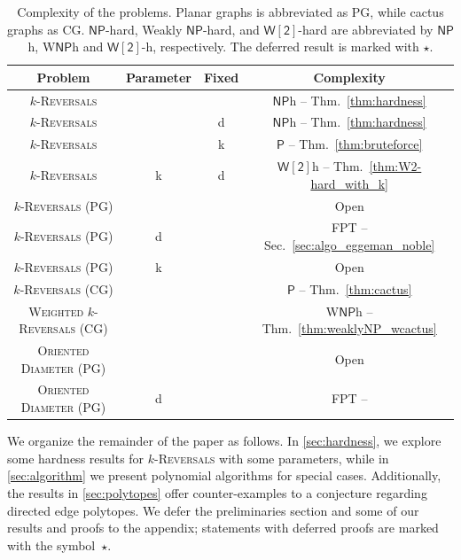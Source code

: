 \documentclass[11pt, twoside]{article}
\numberwithin{equation}{section}
\numberwithin{table}{section}
\numberwithin{figure}{section}
\theoremstyle{definition}
\theoremstyle{definition}
\theoremstyle{definition}
\def\NP{\mathsf{NP}}
\def\P{\mathsf{P}}
\def\W2{\mathsf{W[2]}}
\begin{document}
\begin{table}[h] \small
    \centering
    \caption{\small Complexity of the problems. Planar graphs is abbreviated as PG, while cactus graphs as CG. $\NP$-hard, Weakly $\NP$-hard, and $\W2$-hard are abbreviated by $\NP$h, W$\NP$h and $\W2$-h, respectively. The deferred result is marked with $\star$.}
    \label{table:complexity}
    \renewcommand*{\arraystretch}{0.85}
    \begin{tabular}{|c|c|c|c|} 
    \hline
    \textbf{Problem} & \textbf{Parameter} & \textbf{Fixed} & \textbf{Complexity} \\ \hline
         \textsc{$k$-Reversals}&  &  & $\NP$h -- Thm.~\ref{thm:hardness}\\
         \hline
         \textsc{$k$-Reversals}&  &  d& $\NP$h -- Thm.~\ref{thm:hardness}\\
         \hline
         \textsc{$k$-Reversals} &  &  k& $\P$ -- Thm.~\ref{thm:bruteforce} \\
         \hline
         \textsc{$k$-Reversals}&  k&  d& $\W2$h -- Thm.~\ref{thm:W2-hard_with_k}\\
         \hline
         \textsc{$k$-Reversals} (PG)&  &  & Open\\
         \hline
         \textsc{$k$-Reversals} (PG)&  d&  & FPT -- Sec.~\ref{sec:algo_eggeman_noble}\\
         \hline
         \textsc{$k$-Reversals} (PG)&  k&  & Open\\
         \hline
         \textsc{$k$-Reversals} (CG)&  &  & $\P$ -- Thm.~\ref{thm:cactus}\\
         \hline
         \textsc{Weighted $k$-Reversals} (CG)&  &  & W$\NP$h --   Thm.~\ref{thm:weaklyNP_wcactus}\\
         \hline
         \textsc{Oriented Diameter} (PG)&  &  & Open\\
         \hline
         \textsc{Oriented Diameter} (PG)&  d&  & FPT --\cite{eggemann2009minimizing}\\
         \hline
    \end{tabular}
\end{table}



We organize the remainder of the paper as follows. In \cref{sec:hardness}, we explore some hardness results for  \textsc{$k$-Reversals} with some parameters, while in \cref{sec:algorithm} we present polynomial algorithms for special cases. Additionally, the results in \cref{sec:polytopes} offer counter-examples to a conjecture regarding directed edge polytopes. We defer the preliminaries section and some of our results and proofs {to the appendix};  statements with deferred proofs are marked with the symbol~$\star$.
\end{document}
